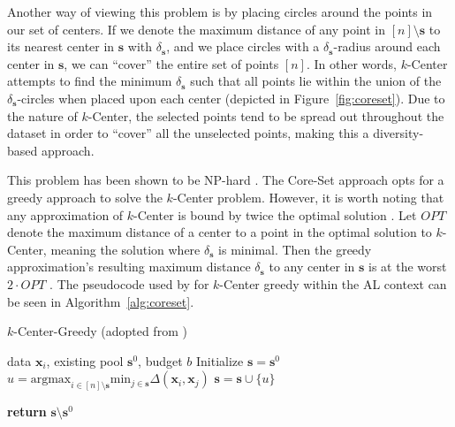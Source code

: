 \documentclass[english,bachelor,ul]{webisthesis} %
\begin{document}
Another way of viewing this problem is by placing circles around the points in our set of centers. If we denote the maximum distance of any point in $ [n] \setminus \mathbf{s} $ to its nearest center in $ \mathbf{s} $ with $ \delta_{\mathbf{s}} $, and we place circles with a $ \delta_{\mathbf{s}} $-radius around each center in $ \mathbf{s} $, we can ``cover'' the entire set of points $ [n] $. In other words, $k$-Center attempts to find the minimum $ \delta_{\mathbf{s}} $ such that all points lie within the union of the $ \delta_{\mathbf{s}} $-circles when placed upon each center (depicted in Figure~\ref{fig:coreset}). Due to the nature of $k$-Center, the selected points tend to be spread out throughout the dataset in order to ``cover'' all the unselected points, making this a diversity-based approach. 

This problem has been shown to be NP-hard \citep{DBLP:journals/dam/HsuN79, DBLP:journals/anor/Hochbaum84}. The Core-Set approach opts for a greedy approach to solve the $k$-Center problem. However, it is worth noting that any approximation of $k$-Center is bound by twice the optimal solution \citep{DBLP:journals/dam/HsuN79}. Let $ OPT $ denote the maximum distance of a center to a point in the optimal solution to $k$-Center, meaning the solution where $\delta_{\mathbf{s}} $ is minimal. Then the greedy approximation's resulting maximum distance $ \delta_{\mathbf{s}} $ to any center in $ \mathbf{s} $ is at the worst $ 2 \cdot OPT $ \citep{mountkcenter}. The pseudocode used by \cite{DBLP:conf/iclr/SenerS18} for $k$-Center greedy within the AL context can be seen in Algorithm~\ref{alg:coreset}.

\vspace{0.4\baselineskip}

\begin{algorithm}[htpb]
    \caption{$k$-Center-Greedy (adopted from \cite{DBLP:conf/iclr/SenerS18})}%
\label{alg:coreset}

\begin{algorithmic}

\Require data $ \mathbf{x}_i $, existing pool $ \mathbf{s}^0 $, budget $ b $
\State Initialize $ \mathbf{s} = \mathbf{s}^0 $
\Repeat
\State $ u = \text{argmax}_{i \in [n] \setminus \mathbf{s}} \text{min}_{j \in \mathbf{s}} \Delta(\mathbf{x}_i, \mathbf{x}_j) $
\State $ \mathbf{s} = \mathbf{s} \cup \{u\} $

\State \textbf{return} $\mathbf{s} \setminus \mathbf{s}^0 $
\end{algorithmic}
\end{algorithm}
\end{document}
